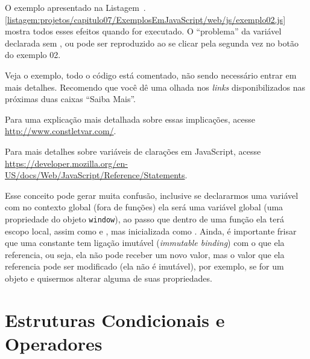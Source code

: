 O exemplo apresentado na Listagem~\thechapter.\ref{listagem:projetos/capitulo07/ExemplosEmJavaScript/web/js/exemplo02.js} mostra todos esses efeitos quando for executado. O ``problema'' da variável declarada sem ,  ou  pode ser reproduzido ao se clicar pela segunda vez no botão do exemplo 02.


Veja o exemplo, todo o código está comentado, não sendo necessário entrar em mais detalhes. Recomendo que você dê uma olhada nos \textit{links} disponibilizados nas próximas duas caixas ``Saiba Mais''.

\begin{saibaMais}
    Para uma explicação mais detalhada sobre essas implicações, acesse \url{http://www.constletvar.com/}.
\end{saibaMais}

\begin{saibaMais}
    Para mais detalhes sobre variáveis de clarações em JavaScript, acesse \url{https://developer.mozilla.org/en-US/docs/Web/JavaScript/Reference/Statements}.
\end{saibaMais}

Esse conceito pode gerar muita confusão, inclusive se declararmos uma variável com  no contexto global (fora de funções) ela será uma variável global (uma propriedade do objeto \texttt{window}), ao passo que dentro de uma função ela terá escopo local, assim como  e , mas inicializada como . Ainda, é importante frisar que uma constante tem ligação imutável (\textit{immutable binding}) com o que ela referencia, ou seja, ela não pode receber um novo valor, mas o valor que ela referencia pode ser modificado (ela não é imutável), por exemplo, se for um objeto e quisermos alterar alguma de suas propriedades.



\section{Estruturas Condicionais e Operadores}

